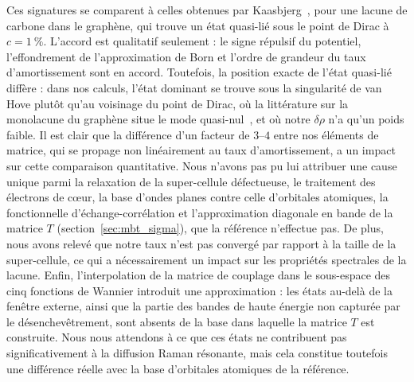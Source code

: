 Ces signatures se comparent à celles obtenues par Kaasbjerg~\cite{kaasbjergAtomisticMatrixTheory2020}, pour une lacune de carbone dans le graphène, qui trouve un état quasi-lié sous le point de Dirac à $c=1~\%$. L'accord est qualitatif seulement : le signe répulsif du potentiel, l'effondrement de l'approximation de Born et l'ordre de grandeur du taux d'amortissement sont en accord. Toutefois, la position exacte de l'état quasi-lié diffère : dans nos calculs, l'état dominant se trouve sous la singularité de van Hove plutôt qu'au voisinage du point de Dirac, où la littérature sur la monolacune du graphène situe le mode quasi-nul~\cite{pereiraDisorderInducedLocalized2006}, et où notre $\delta\rho$ n'a qu'un poids faible. Il est clair que la différence d'un facteur de $3$--$4$ entre nos éléments de matrice, qui se propage non linéairement au taux d'amortissement, a un impact sur cette comparaison quantitative. Nous n'avons pas pu lui attribuer une cause unique parmi la relaxation de la super-cellule défectueuse, le traitement des électrons de cœur, la base d'ondes planes contre celle d'orbitales atomiques, la fonctionnelle d'échange-corrélation et l'approximation diagonale en bande de la matrice $T$ (section~\ref{sec:mbt_sigma}), que la référence n'effectue pas. De plus, nous avons relevé que notre taux n'est pas convergé par rapport à la taille de la super-cellule, ce qui a nécessairement un impact sur les propriétés spectrales de la lacune. Enfin, l'interpolation de la matrice de couplage dans le sous-espace des cinq fonctions de Wannier introduit une approximation : les états au-delà de la fenêtre externe, ainsi que la partie des bandes de haute énergie non capturée par le désenchevêtrement, sont absents de la base dans laquelle la matrice $T$ est construite. Nous nous attendons à ce que ces états ne contribuent pas significativement à la diffusion Raman résonante, mais cela constitue toutefois une différence réelle avec la base d'orbitales atomiques de la référence.

